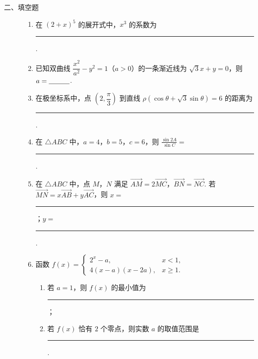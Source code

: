 \begin{description}

    \item[二、填空题]

    \begin{enumerate}[leftmargin=5pt]

      \addtocounter{enumi}{+8}

        \item 在 \((2 + x)^5\) 的展开式中，\(x^3\) 的系数为\rule[-0.3ex]{3em}{0.4pt}.

        \item 已知双曲线 \(\dfrac{x^2}{a^2}-y^2=1\)（\(a>0\)）的一条渐近线为 \(\sqrt{3}x+y=0\)，则 \(a=\rule[-0.3ex]{3em}{0.4pt}\).

        \item 在极坐标系中，点 \(\left(2,\dfrac{\pi}{3}\right)\) 到直线 \(\rho(\cos\theta+\sqrt{3}\sin\theta)=6\) 的距离为\rule[-0.3ex]{3em}{0.4pt}.

        \item 在 \(\triangle ABC\) 中，\(a = 4\)，\(b = 5\)，\(c = 6\)，则 \(\frac{\sin 2A}{\sin C} = \)\rule[-0.3ex]{3em}{0.4pt}.

        \item 在 \(\triangle ABC\) 中，点 \(M\)，\(N\) 满足 \(\overrightarrow{AM} = 2\overrightarrow{MC}\)，\(\overrightarrow{BN} = \overrightarrow{NC}\). 若 \(\overrightarrow{MN} = x\overrightarrow{AB} + y\overrightarrow{AC}\)，则 \(x =\)\rule[-0.3ex]{3em}{0.4pt}；\(y =\)\rule[-0.3ex]{3em}{0.4pt}.

        \item 函数 \(f(x)=\begin{cases}
2^x-a, & x<1,\\
4(x-a)(x-2a), & x\geqslant 1.
\end{cases}\)

\begin{enumerate}
\item 若 \(a=1\)，则 \(f(x)\) 的最小值为\rule[-0.3ex]{3em}{0.4pt}；
\item 若 \(f(x)\) 恰有 \(2\) 个零点，则实数 \(a\) 的取值范围是\rule[-0.3ex]{3em}{0.4pt}.
\end{enumerate}

    \end{enumerate}

\end{description}


